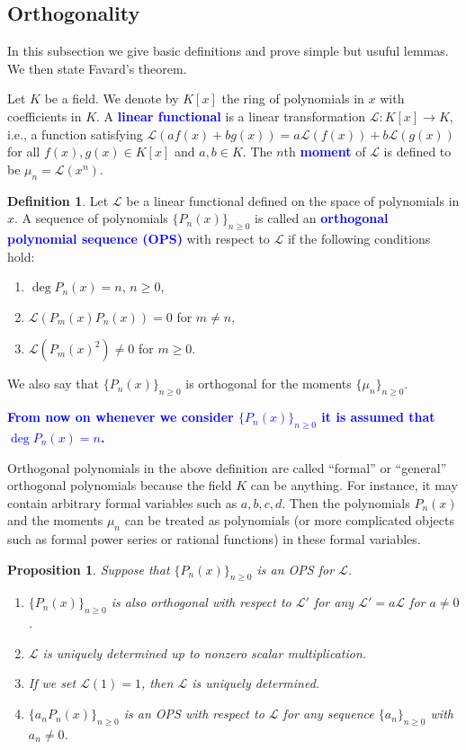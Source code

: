 \documentclass{amsart}
\numberwithin{equation}{section}
\newtheorem{prop}[thm]{Proposition}
\theoremstyle{definition}
\newtheorem{defn}[thm]{Definition}
\newcommand\LL{\mathcal{L}}
\renewcommand\emph[1]{\textcolor{blue}{\bf #1}}
\begin{document}
\subsection{Orthogonality}

In this subsection we give basic definitions and prove simple but
usuful lemmas. We then state Favard's theorem.


Let \( K \) be a field. We denote by \( K[x] \) the ring of
polynomials in \( x \) with coefficients in \( K \). A \emph{linear
  functional} is a linear transformation \( \LL:K[x]\to K \), i.e., a
function satisfying \( \LL(af(x)+bg(x)) = a \LL(f(x))+b \LL(g(x)) \)
for all \( f(x),g(x)\in K[x] \) and \( a,b\in K \). The \( n \)th
\emph{moment} of \( \LL \) is defined to be \( \mu_n = \LL(x^n) \).

\begin{defn}\label{def:formal-ops}
  Let \( \LL \) be a linear functional defined on the space of
  polynomials in \( x \). A sequence of polynomials
  \( \{P_n(x)\}_{n\ge0} \) is called an \emph{orthogonal polynomial
    sequence (OPS)} with respect to \( \LL \) if the following
  conditions hold:
  \begin{enumerate}
  \item \( \deg P_n(x) = n \), \( n\ge0 \),
  \item \( \LL(P_m(x)P_n(x))  = 0 \) for \( m\ne n \),
  \item \( \LL(P_m(x)^2) \ne 0 \) for \( m\ge0 \).
  \end{enumerate}
  We also say that \( \{ P_n(x) \}_{n\ge 0} \) is orthogonal
  for the moments \( \{\mu_n\}_{n\ge0} \).
\end{defn}

\emph{From now on whenever we consider \( \{ P_n(x) \}_{n\ge 0} \) it is
assumed that \( \deg P_n(x) = n \).}

Orthogonal polynomials in the above definition are called ``formal''
or ``general'' orthogonal polynomials because the field \( K \) can be
anything. For instance, it may contain arbitrary formal variables such
as \( a,b,c,d \). Then the polynomials \( P_n(x) \) and the moments
\( \mu_n \) can be treated as polynomials (or more complicated objects
such as formal power series or rational functions) in these formal
variables.

\begin{prop}
  Suppose that \( \{ P_n(x) \}_{n\ge 0} \) is an OPS for \( \LL \).
\begin{enumerate}
\item \( \{ P_n(x) \}_{n\ge 0} \) is also orthogonal with respect to
  \( \LL' \) for any \( \LL' = a\LL \) for \( a\ne 0 \).
\item \( \LL \) is uniquely determined up to
  nonzero scalar multiplication. 
\item If we set \( \LL(1) = 1 \), then \( \LL \) is uniquely
  determined.
\item \( \{ a_nP_n(x) \}_{n\ge 0} \) is an OPS with respect to
  \( \LL \) for any sequence \( \{ a_n\}_{n\ge 0} \) with
  \( a_n\ne 0 \).
\end{enumerate}
\end{prop}
\end{document}
